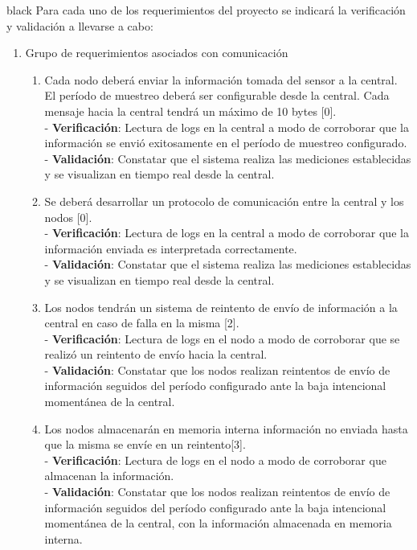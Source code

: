 \documentclass[11pt]{charter}
\begin{document}
\begin{consigna}{black}
Para cada uno de los requerimientos del proyecto se indicará la verificación y validación a llevarse a cabo:

\begin{enumerate}
\item Grupo de requerimientos asociados con comunicación
	\begin{enumerate}
	\item Cada nodo deberá enviar la información tomada del sensor a la central. El período de muestreo deberá ser configurable desde la central. Cada mensaje hacia la central tendrá un máximo de 10 bytes [0].
	\\ - \textbf{Verificación}: Lectura de logs en la central a modo de corroborar que la información se envió exitosamente en el período de muestreo configurado.
	\\ - \textbf{Validación}: Constatar que el sistema realiza las mediciones establecidas y se visualizan en tiempo real desde la central.
		
	\item Se deberá desarrollar un protocolo de comunicación entre la central y los nodos [0].
	\\ - \textbf{Verificación}: Lectura de logs en la central a modo de corroborar que la información enviada es interpretada correctamente.
	\\ - \textbf{Validación}: Constatar que el sistema realiza las mediciones establecidas y se visualizan en tiempo real desde la central.
	
	\item Los nodos tendrán un sistema de reintento de envío de información a la central en caso de falla en la misma [2].
	\\ - \textbf{Verificación}: Lectura de logs en el nodo a modo de corroborar que se realizó un reintento de envío hacia la central.
	\\ - \textbf{Validación}: Constatar que los nodos realizan reintentos de envío de información seguidos del período configurado ante la baja intencional momentánea de la central.
	
	\item Los nodos almacenarán en memoria interna información no enviada hasta que la misma se envíe en un reintento[3].
	\\ - \textbf{Verificación}: Lectura de logs en el nodo a modo de corroborar que almacenan la información.
	\\ - \textbf{Validación}: Constatar que los nodos realizan reintentos de envío de información seguidos del período configurado ante la baja intencional momentánea de la central, con la información almacenada en memoria interna.
	

\end{enumerate}
\end{enumerate}
\end{consigna}
\end{document}
